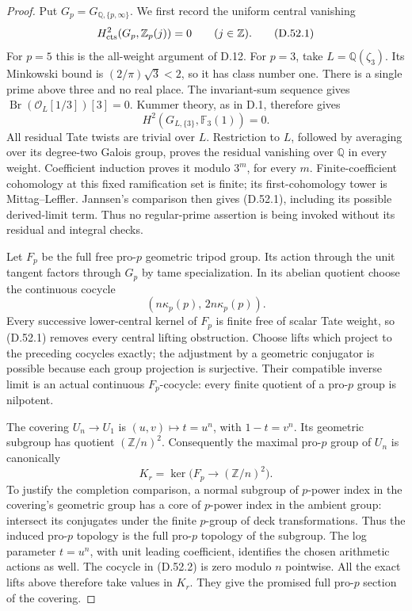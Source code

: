\begin{proof}
Put \(G_p=G_{\mathbb Q,\{p,\infty\}}\).
We first record the uniform central vanishing
\[
 H^2_{\rm cts}(G_p,\mathbb Z_p(j))=0
                      \qquad(j\in\mathbb Z).                    \tag{D.52.1}
\]
For \(p=5\) this is the all-weight argument
of D.12. For \(p=3\), take
\(L=\mathbb Q(\zeta_3)\).
Its Minkowski bound is
\((2/\pi)\sqrt3<2\), so it has class
number one. There is a single prime above
three and no real place. The invariant-sum
sequence gives
\(\operatorname{Br}(\mathcal O_L[1/3])[3]=0\).
Kummer theory, as in D.1, therefore gives
\[
 H^2(G_{L,\{3\}},\mathbb F_3(1))=0.
 \]
All residual Tate twists are trivial over
\(L\). Restriction to \(L\), followed by
averaging over its degree-two Galois group,
proves the residual vanishing over
\(\mathbb Q\) in every weight.
Coefficient induction proves it modulo
\(3^m\), for every \(m\). Finite-coefficient
cohomology at this fixed ramification set
is finite; its first-cohomology tower is
Mittag--Leffler. Jannsen's comparison then
gives (D.52.1), including its possible
derived-limit term. Thus no regular-prime
assertion is being invoked without its
residual and integral checks.

Let \(F_p\) be the full free pro-\(p\)
geometric tripod group. Its action through
the unit tangent factors through \(G_p\)
by tame specialization. In its abelian
quotient choose the continuous cocycle
\[
              (n\kappa_p(p),\,2n\kappa_p(p)).
                                                               \tag{D.52.2}
\]
Every successive lower-central kernel
of \(F_p\) is finite free of scalar Tate
weight, so (D.52.1) removes every central
lifting obstruction. Choose lifts which
project to the preceding cocycles exactly;
the adjustment by a geometric conjugator
is possible because each group projection
is surjective. Their compatible inverse
limit is an actual continuous \(F_p\)-cocycle:
every finite quotient of a pro-\(p\) group
is nilpotent.

The covering \(U_n\to U_1\) is
\((u,v)\mapsto t=u^n\), with
\(1-t=v^n\). Its geometric subgroup
has quotient \((\mathbb Z/n)^2\).
Consequently the maximal pro-\(p\)
group of \(U_n\) is canonically
\[
 K_r=\ker\bigl(F_p\longrightarrow
                         (\mathbb Z/n)^2\bigr).
                                                               \tag{D.52.3}
\]
To justify the completion comparison,
a normal subgroup of \(p\)-power index
in the covering's geometric group has
a core of \(p\)-power index in the
ambient group: intersect its conjugates
under the finite \(p\)-group of deck
transformations. Thus the induced
pro-\(p\) topology is the full
pro-\(p\) topology of the subgroup.
The log parameter \(t=u^n\), with unit
leading coefficient, identifies the
chosen arithmetic actions as well.
The cocycle in (D.52.2) is zero
modulo \(n\) pointwise. All the exact
lifts above therefore take values in
\(K_r\). They give the promised full
pro-\(p\) section of the covering.


\end{proof}
